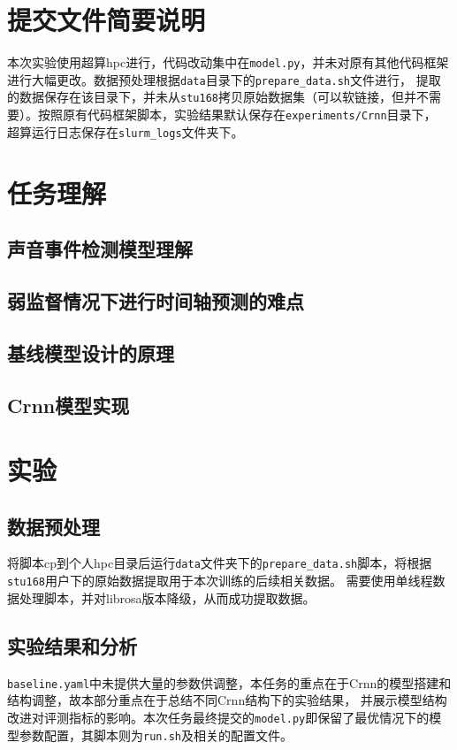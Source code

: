 \documentclass[]{ctexart}
\begin{document}
\section{提交文件简要说明}
本次实验使用超算hpc进行，代码改动集中在\texttt{model.py}，并未对原有其他代码框架进行大幅更改。数据预处理根据\texttt{data}目录下的\texttt{prepare\_data.sh}文件进行，
提取的数据保存在该目录下，并未从\texttt{stu168}拷贝原始数据集（可以软链接，但并不需要）。按照原有代码框架脚本，实验结果默认保存在\texttt{experiments/Crnn}目录下，
超算运行日志保存在\texttt{slurm\_logs}文件夹下。
\section{任务理解}

\subsection{声音事件检测模型理解}

\subsection{弱监督情况下进行时间轴预测的难点}

\subsection{基线模型设计的原理}

\subsection{Crnn模型实现}

\newpage
\section{实验}

\subsection{数据预处理}
将脚本cp到个人hpc目录后运行\texttt{data}文件夹下的\texttt{prepare\_data.sh}脚本，将根据\texttt{stu168}用户下的原始数据提取用于本次训练的后续相关数据。
需要使用单线程数据处理脚本，并对librosa版本降级，从而成功提取数据。
\subsection{实验结果和分析}
\texttt{baseline.yaml}中未提供大量的参数供调整，本任务的重点在于Crnn的模型搭建和结构调整，故本部分重点在于总结不同Crnn结构下的实验结果，
并展示模型结构改进对评测指标的影响。本次任务最终提交的\texttt{model.py}即保留了最优情况下的模型参数配置，其脚本则为\texttt{run.sh}及相关的配置文件。
\end{document}
